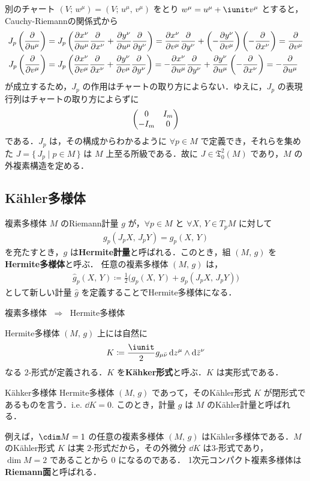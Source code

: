 \documentclass[geometry_main]{subfiles}
\begin{document}
別のチャート $(V;\, w^\mu) = (V;\, u^\mu,\, v^\mu)$ をとり $w^\mu = u^\mu + \iunit v^\mu$ とすると，Cauchy-Riemannの関係式から
\begin{align} 
	J_p \left(\pdv{}{u^\mu}\right) &= J_p \left(\pdv{x^\nu}{u^\mu} \pdv{}{x^\nu} + \pdv{y^\nu}{u^\mu} \pdv{}{y^\nu} \right) = \pdv{x^\nu}{v^\mu} \pdv{}{y^\nu} + \left(-\pdv{y^\nu}{v^\mu}\right) \left(-\pdv{}{x^\nu}\right) = \pdv{}{v^\mu} \\
	J_p \left(\pdv{}{v^\mu}\right) &= J_p \left(\pdv{x^\nu}{v^\mu} \pdv{}{x^\nu} + \pdv{y^\nu}{v^\mu} \pdv{}{y^\nu} \right) = -\pdv{x^\nu}{u^\mu} \pdv{}{y^\nu} + \pdv{y^\nu}{u^\mu} \left(-\pdv{}{x^\nu}\right) = -\pdv{}{u^\mu}
\end{align}
が成立するため，$J_p$ の作用はチャートの取り方によらない．ゆえに，$J_p$ の表現行列はチャートの取り方によらずに
\begin{align} 
	\mqty(0 & I_m \\ -I_m & 0)\label{eq.rep1}
\end{align}
である．$J_p$ は，その構成からわかるように $\forall p \in M$ で定義でき，それらを集めた $J = \{\, J_p \mid p \in M\, \}$ は $M$ 上至る所\cinfty 級である．故に $J \in \mathfrak{T}^2_0(M)$ であり，$M$ の外複素構造を定める．

\subsection{K\"ahler多様体}

複素多様体 $M$ のRiemann計量 $g$ が，$\forall p \in M$ と $\forall X,\, Y \in T_pM$ に対して
\begin{align} 
	g_p(J_p X,\, J_p Y) = g_p(X,\, Y)
\end{align}
を充たすとき，$g$ は\textbf{Hermite計量}と呼ばれる．このとき，組 $(M,\, g)$ を\textbf{Hermite多様体}と呼ぶ．
任意の複素多様体 $(M,\, g)$ は，
\begin{align} 
	\hat{g}_p(X,\, Y) \coloneqq \frac{1}{2} \bigl( g_p(X,\, Y) + g_p(J_p X,\, J_p Y) \bigr) 
\end{align}
として新しい計量 $\hat{g}$ を定義することでHermite多様体になる．

\begin{tcolorbox} 
	複素多様体 $\; \Longrightarrow \;$ Hermite多様体
\end{tcolorbox}


Hermite多様体 $(M,\, g)$ 上には自然に
\begin{align} 
	K \coloneqq \frac{\iunit}{2} g_{\mu \bar{\nu}} \dd{z^\mu} \wedge \dd{\bar{z}^\nu}
\end{align}
なる $2$-形式が定義される．$K$ を\textbf{K\"ahker形式}と呼ぶ．$K$ は実形式である．

\begin{mydef}[label=Kahler]{K\"ahker多様体}
	Hermite多様体 $(M,\, g)$ であって，そのK\"ahler形式 $K$ が閉形式であるものを言う．i.e. $\dd{K} = 0.$ このとき，計量 $g$ は $M$ のK\"ahler計量と呼ばれる．
\end{mydef}

例えば，$\cdim M = 1$ の任意の複素多様体 $(M,\, g)$ はK\"ahler多様体である．$M$ のK\"ahler形式 $K$ は実 $2$-形式だから，その外微分 $\dd{K}$ は$3$-形式であり，$\dim M = 2$ であることから $0$ になるのである．
1次元コンパクト複素多様体は\textbf{Riemann面}と呼ばれる．
\end{document}
